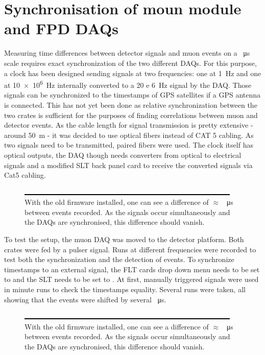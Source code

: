   \section{Synchronisation of moun module and FPD DAQs}
  \label{ch:Analysis:sec:Synchronisation of moun module and FPD DAQs}
  Measuring time differences between detector signals and muon events on a \SI{}{\micro\second} scale requires exact synchronization of the two different DAQs. For this purpose, a clock has been designed sending signals at two frequencies: one at \SI{1}{\hertz} and one at \SI{10e6}{\hertz} internally converted to a \SI{20 e 6}{\hertz} signal by the DAQ. Those signals can be synchronized to the timestamps of GPS satellites if a GPS antenna is connected. This has not yet been done as relative synchronization between the two crates is sufficient for the purposes of finding correlations between muon and detector events. As the cable length for signal transmission is pretty extensive - around \SI{50}{\meter} - it was decided to use optical fibers instead of CAT 5 cabling. As two signals need to be transmitted, paired  fibers were used. The clock itself has optical outputs, the DAQ though needs converters from optical to electrical signals and a modified SLT back panel card to receive the converted 
signals via Cat5 cabling.
  \begin{figure}
  	\includegraphics[width = 0.9 \textwidth]{graphics/dummy.eps}
  	\caption[Unsynced DAQs]{With the old firmware installed, one can see a difference of $\approx$ \SI{}{\micro\second} between events recorded. As the signals occur simultaneously and the DAQs are synchronised, this difference should vanish.}
  	\label{fig:analysis:outOfSync}
  \end{figure}

  
  To test the setup, the muon DAQ was moved to the detector platform. Both crates were fed by a pulser signal. Runs at different frequencies were recorded to test both the synchronization and the detection of events. To synchronize timestamps to an external signal, the FLT cards drop down menu needs to be set to  and the SLT needs to be set to .
  At first, manually triggered signals were used in minute runs to check the timestamps equality. Several runs were taken, all showing that the events were shifted by several \SI{}{\micro\second}.
  \begin{figure}
	\includegraphics[width = 0.9 \textwidth]{graphics/dummy.eps}
  	\caption[Unsynced DAQs]{With the old firmware installed, one can see a difference of $\approx$ \SI{}{\micro\second} between events recorded. As the signals occur simultaneously and the DAQs are synchronised, this difference should vanish.}
  	\label{fig:analysis:inSync}
  \end{figure}

